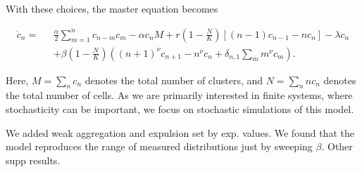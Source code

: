 \documentclass[aps,pre,twocolumn]{revtex4-1}
\def\be{\begin{equation}}
\def\ee{\end{equation}}
\begin{document}
%



With these choices, the master equation becomes 

\begin{widetext}
	\begin{align*}
	\dot{c}_n = \text{ }& \frac{\alpha}{2}\sum_{m=1}^{n} c_{n-m}c_m - \alpha c_n M + r\left(1-\frac{N}{K}\right)\left[(n-1)c_{n-1} - nc_n\right]  - \lambda c_n \nonumber\\[6pt]
	&+\beta\left(1-\frac{N}{K}\right)\left((n+1)^{\nu}c_{n+1}- n^{\nu}c_n + \delta_{n,1}\sum_m m^{\nu}c_m\right). 
	\end{align*}
\end{widetext}

Here, $M = \sum_n c_n$ denotes the total number of clusters, and $N = \sum_n n c_n$ denotes the total number of cells. As we are primarily interested in finite systems, where stochasticity can be important, we focus on stochastic simulations of this model. 

We added weak aggregation and expulsion set by exp. values. We found that the model reproduces the range of measured distributions just by sweeping $\beta$. Other supp results.
\end{document}
